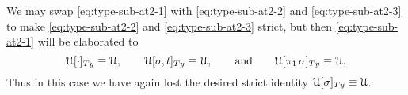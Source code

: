 \documentclass[a4paper,UKenglish,numberwithinsect,cleveref,thm-restate]{lipics-v2021}
\begin{document}
We may swap \eqref{eq:type-sub-at2-1} with \eqref{eq:type-sub-at2-2} and \eqref{eq:type-sub-at2-3} to make \eqref{eq:type-sub-at2-2} and \eqref{eq:type-sub-at2-3} strict, but then \eqref{eq:type-sub-at2-1} will be elaborated to 
\[
\subTy{\UU}{\emptysub}         \judgeq \UU, \qquad
\subTy{\UU}{\sigma, t}         \judgeq \UU, \qquad\text{and}\qquad 
\subTy{\UU}{\pi_1\,\sigma}     \judgeq \UU,
\]
Thus in this case we have again lost the desired strict identity $\subTy{\UU}{\sigma} \equiv \UU$.
%
\end{document}
